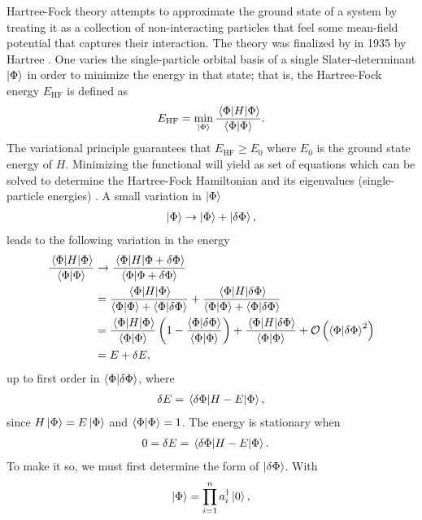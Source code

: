 \documentclass[10pt]{article}
\begin{document}
Hartree-Fock theory attempts to approximate the ground state of a system by treating it as a collection of non-interacting particles that feel some mean-field potential that captures their interaction. The theory was finalized by in 1935 by Hartree \cite{hartree}. One varies the single-particle orbital basis of a single Slater-determinant $\ket{\Phi}$ in order to minimize the energy in that state; that is, the Hartree-Fock energy $E_{\text{HF}}$ is defined as
\begin{align}
E_{\text{HF}}
=
\min_{\ket{\Phi}}\frac{\mel{\Phi}{H}{\Phi}}{\bra{\Phi}\ket{\Phi}}.
\end{align}
The variational principle guarantees that $E_{\text{HF}}\geq E_0$
where $E_0$ is the ground state energy of $H$. Minimizing the functional will yield as set of equations which can be solved to determine the Hartree-Fock Hamiltonian and its eigenvalues (single-particle energies) \cite{hf_derivation}. A small variation in $\ket{\Phi}$
\begin{align}
\ket{\Phi}\to\ket{\Phi}+\ket{\delta\Phi},
\end{align}
leads to the following variation in the energy
\begin{align}
\frac{\mel{\Phi}{H}{\Phi}}{\bra{\Phi}\ket{\Phi}}
&\to
\frac{\mel{\Phi}{H}{\Phi+\delta\Phi}}{\bra{\Phi}\ket{\Phi+\delta\Phi}}
\\
&=
\frac{\mel{\Phi}{H}{\Phi}}{\bra{\Phi}\ket{\Phi}+\bra{\Phi}\ket{\delta\Phi}}
+
\frac{\mel{\Phi}{H}{\delta\Phi}}{\bra{\Phi}\ket{\Phi}+\bra{\Phi}\ket{\delta\Phi}}
\\
&=
\frac{\mel{\Phi}{H}{\Phi}}{\bra{\Phi}\ket{\Phi}}
\left(1-\frac{\bra{\Phi}\ket{\delta\Phi}}{\bra{\Phi}\ket{\Phi}}\right)
+
\frac{\mel{\Phi}{H}{\delta\Phi}}{\bra{\Phi}\ket{\Phi}}
+
\mathcal{O}\left(\bra{\Phi}\ket{\delta\Phi}^2\right)
\\
&=
E+\delta E,
\end{align}
up to first order in $\bra{\Phi}\ket{\delta\Phi}$, where
\begin{align}
\delta E = \mel{\delta\Phi}{H-E}{\Phi},
\end{align}
since $H\ket{\Phi}=E\ket{\Phi}$ and $\bra{\Phi}\ket{\Phi}=1$. The energy is stationary when
\begin{align}
\label{hf_energy_stationary}
0
&=
\delta E
=
\mel{\delta\Phi}{H-E}{\Phi}.
\end{align}
To make it so, we must first determine the form of $\ket{\delta\Phi}$. With
\begin{align}
\ket{\Phi}
=
\prod_{i=1}^na^\dagger_i\ket{0},
\end{align}
\end{document}
